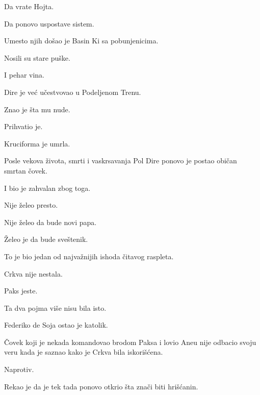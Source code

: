 Da vrate Hojta.

Da ponovo uspostave sistem.

\bigskip

Umesto njih došao je Basin Ki sa pobunjenicima.

\bigskip

Nosili su stare puške.

I pehar vina.

\bigskip

Dire je već učestvovao u Podeljenom Trenu.

\bigskip

Znao je šta mu nude.

\bigskip

Prihvatio je.

\bigskip

Kruciforma je umrla.

\bigskip

Posle vekova života, smrti i vaskrsavanja Pol Dire ponovo je postao običan smrtan čovek.

\bigskip

I bio je zahvalan zbog toga.

\bigskip

Nije želeo presto.

\bigskip

Nije želeo da bude novi papa.

\bigskip

Želeo je da bude sveštenik.

\bigskip

To je bio jedan od najvažnijih ishoda čitavog raspleta.

\bigskip

Crkva nije nestala.

\bigskip

Paks jeste.

\bigskip

Ta dva pojma više nisu bila isto.

\bigskip

Federiko de Soja ostao je katolik.

\bigskip

Čovek koji je nekada komandovao brodom Paksa i lovio Aneu nije odbacio svoju veru kada je saznao kako je Crkva bila iskorišćena.

\bigskip

Naprotiv.

\bigskip

Rekao je da je tek tada ponovo otkrio šta znači biti hrišćanin.

